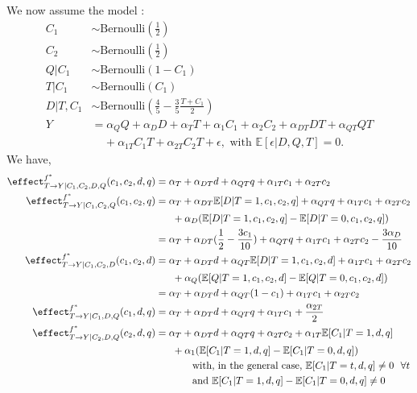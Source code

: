 We now assume the model :
\begin{align*}
    C_1 &\sim \text{Bernoulli}(\frac{1}{2}) \\
    C_2 &\sim \text{Bernoulli}(\frac{1}{2}) \\
    Q | C_1 &\sim \text{Bernoulli}(1 - C_1) \\
    T | C_1 &\sim \text{Bernoulli}(C_1) \\
    D | T,C_1 &\sim \text{Bernoulli}(\frac{4}{5} - \frac{3}{5}\frac{T+C_1}{2}) \\
    Y &= \alpha_Q Q + \alpha_D D + \alpha_T T + \alpha_1 C_1 + \alpha_2 C_2 + \alpha_{DT} DT + \alpha_{QT} QT \\
    & \ \ \ \ \ + \alpha_{1T} C_1T + \alpha_{2T} C_2T   + \epsilon, \text{ with } \mathbb{E}[\epsilon | D, Q, T] = 0.
\end{align*}
We have,
\begin{align*}
    \effect^{f^*}_{T \rightarrow Y | C_1, C_2, D, Q}(c_1,c_2,d,q) &= \alpha_T + \alpha_{DT}d + \alpha_{QT}q + \alpha_{1T}c_1 + \alpha_{2T}c_2 \\
    \effect^{f^*}_{T \rightarrow Y | C_1, C_2, Q}(c_1,c_2,q) &= \alpha_T + \alpha_{DT}\mathbb{E}[D|T=1,c_1,c_2,q] + \alpha_{QT}q + \alpha_{1T}c_1 + \alpha_{2T}c_2 \\
    & \ \ \ \ \ + \alpha_D (\mathbb{E}[D|T=1,c_1,c_2,q] - \mathbb{E}[D|T=0,c_1,c_2,q]) \\
    &= \alpha_T + \alpha_{DT}(\frac{1}{2} - \frac{3c_1}{10}) + \alpha_{QT}q + \alpha_{1T}c_1 + \alpha_{2T}c_2 - \frac{3\alpha_D}{10} \\
    \effect^{f^*}_{T \rightarrow Y | C_1, C_2, D}(c_1,c_2,d) &= \alpha_T + \alpha_{DT}d + \alpha_{QT}\mathbb{E}[D|T=1,c_1,c_2,d] + \alpha_{1T}c_1 + \alpha_{2T}c_2 \\
    & \ \ \ \ \ + \alpha_Q (\mathbb{E}[Q|T=1,c_1,c_2,d] -  \mathbb{E}[Q|T=0,c_1,c_2,d]) \\
    &= \alpha_T + \alpha_{DT}d + \alpha_{QT}(1 - c_1) + \alpha_{1T}c_1 + \alpha_{2T}c_2 \\
    \effect^{f^*}_{T \rightarrow Y | C_1, D, Q}(c_1,d,q) &= \alpha_T + \alpha_{DT}d + \alpha_{QT}q + \alpha_{1T}c_1 + \frac{\alpha_{2T}}{2} \\
    \effect^{f^*}_{T \rightarrow Y | C_2, D, Q}(c_2,d,q) &= \alpha_T + \alpha_{DT}d + \alpha_{QT}q + \alpha_{2T}c_2 + \alpha_{1T}\mathbb{E}[C_1|T=1,d,q]\\
    & \ \ \ \ \ + \alpha_1(\mathbb{E}[C_1|T=1,d,q] - \mathbb{E}[C_1|T=0,d,q]) \\
    & \ \ \ \ \ \ \ \ \ \ \text{ with, in the general case, } \mathbb{E}[C_1|T=t,d,q] \neq 0 \ \ \forall t \\
    & \ \ \ \ \ \ \ \ \ \ \text{ and } \mathbb{E}[C_1|T=1,d,q] - \mathbb{E}[C_1|T=0,d,q] \neq 0
\end{align*}
